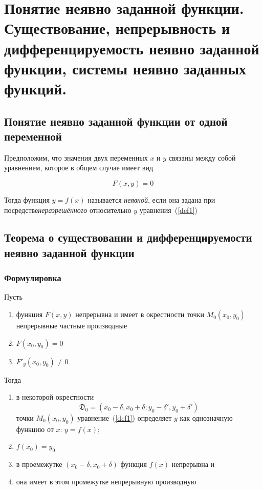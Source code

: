 \section{Понятие неявно заданной функции.
Существование, непрерывность и дифференцируемость неявно заданной функции,
системы неявно заданных функций.}

\subsection{Понятие неявно заданной функции от одной переменной}Предположим, что значения двух переменных $x$ и $y$ связаны между собой уравнением, которое в общем случае имеет вид

\begin{equation}\label{def1}
    F(x, y) = 0
\end{equation}

Тогда функция $y = f(x)$ называется \emph{неявной}, если она задана при посредстве\emph{неразрешённого} относительно $y$ уравнения~(\ref{def1})

\subsection{Теорема о существовании и дифференцируемости неявно заданной функции}

\subsubsection*{Формулировка}

Пусть 
\begin{enumerate}
    \item функция $F(x, y)$ непрерывна и имеет в окрестности точки $M_0(x_0, y_0)$
    непрерывные частные производные
    \item $F(x_0, y_0) = 0$
    \item $F'_y(x_0, y_0) \neq 0$
\end{enumerate}
Тогда
\begin{enumerate}
    \item в некоторой окрестности 
    \begin{equation*}
        \mathfrak{D}_0 = (x_0 - \delta, x_0 + \delta; y_0 - \delta', y_0 + \delta')
    \end{equation*}
    точки $M_0 (x_0, y_0)$ уравнение~(\ref{def1}) определяет $y$ как однозначную
    функцию от $x$: $y = f(x)$;
    \item $f(x_0) = y_0$
    \item в проемежутке $(x_0 - \delta, x_0 + \delta)$ функция $f(x)$ непрерывна и
    \item она имеет в этом промежутке непрерывную производную
\end{enumerate}

